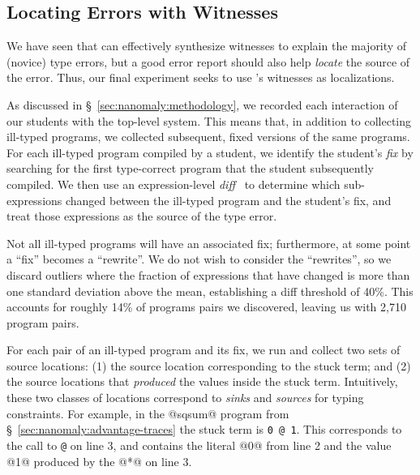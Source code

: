 
\subsection{Locating Errors with Witnesses}
\label{sec:nanomaly:locating}

We have seen that \toolname can effectively synthesize witnesses to
explain the majority of (novice) type errors, but a good error report
should also help \emph{locate} the source of the error.
%
Thus, our final experiment seeks to use \toolname's witnesses as
localizations.


As discussed in \S~\ref{sec:nanomaly:methodology}, we recorded
each interaction of our students with the \ocaml top-level system.
%
This means that, in addition to collecting ill-typed programs, we
collected subsequent, fixed versions of the same programs.
%
For each ill-typed program compiled by a student, we identify the student's
\emph{fix} by searching for the first type-correct program that the student
subsequently compiled.
%
We then use an expression-level \emph{diff}~\cite{Lempsink2009-xf} to
determine which sub-expressions changed between the ill-typed program
and the student's fix, and treat those expressions as the source of the
type error.

Not all ill-typed programs will have an associated fix; furthermore,
at some point a ``fix'' becomes a ``rewrite''.
%
We do not wish to consider the ``rewrites'', so we discard outliers
where the fraction of expressions that have changed is more than one
standard deviation above the mean, establishing a diff threshold of
40\%.
%
This accounts for roughly 14\% of programs pairs we discovered, leaving
us with 2,710 program pairs.

For each pair of an ill-typed program and its fix, we run \toolname and
collect two sets of source locations:
%
(1) the source location corresponding to the stuck term; and
%
(2) the source locations that \emph{produced} the values inside the
stuck term.
%
Intuitively, these two classes of locations correspond to \emph{sinks}
and \emph{sources} for typing constraints.
%
For example, in the @sqsum@ program from \S~\ref{sec:nanomaly:advantage-traces}
the stuck term is \verb!0 @ 1!.
%
This corresponds to the call to \verb!@! on line 3, and contains
the literal @0@ from line 2 and the value @1@ produced by the
@*@ on line 3.

